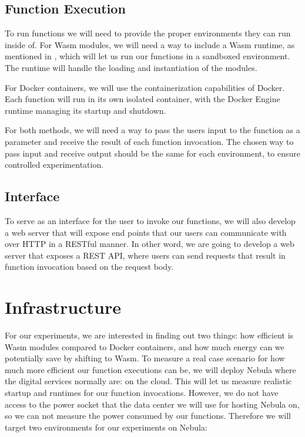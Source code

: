 \documentclass[
  table]{report}
\begin{document}
\subsection{Function Execution}

To run functions we will need to provide the proper environments they
can run inside of. For \ac{Wasm} modules, we will need a way to include
a \ac{Wasm} runtime, as mentioned in , which
will let us run our functions in a sandboxed environment. The runtime
will handle the loading and instantiation of the modules.

For Docker containers, we will use the containerization capabilities of
Docker. Each function will run in its own isolated container, with the
Docker Engine runtime managing its startup and shutdown.

For both methods, we will need a way to pass the users input to the
function as a parameter and receive the result of each function
invocation. The chosen way to pass input and receive output should be
the same for each environment, to ensure controlled experimentation.

\subsection{Interface}

To serve as an interface for the user to invoke our functions, we will
also develop a web server that will expose end points that our users can
communicate with over HTTP in a RESTful manner. In other word, we are
going to develop a web server that exposes a REST API, where users can
send requests that result in function invocation based on the request
body.

\section{Infrastructure}

For our experiments, we are interested in finding out two things: how
efficient is \ac{Wasm} modules compared to Docker containers, and how
much energy can we potentially save by shifting to \ac{Wasm}. To measure
a real case scenario for how much more efficient our function executions
can be, we will deploy Nebula where the digital services normally are:
on the cloud. This will let us measure realistic startup and runtimes
for our function invocations. However, we do not have access to the
power socket that the data center we will use for hosting Nebula on, so
we can not measure the power consumed by our functions. Therefore we
will target two environments for our experiments on Nebula:
\end{document}
